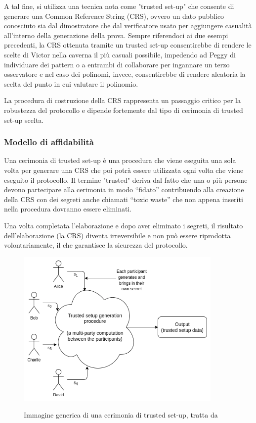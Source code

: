 A tal fine, si utilizza una tecnica nota come "trusted set-up" che consente di generare una Common Reference String
(CRS), ovvero un dato pubblico conosciuto sia dal dimostratore che dal verificatore usato per aggiungere casualità
all’interno della generazione della prova. Sempre riferendoci ai due esempi precedenti, la CRS ottenuta tramite un
trusted set-up consentirebbe di rendere le scelte di Victor nella caverna il più casuali possibile, impedendo ad Peggy
di individuare dei pattern o a entrambi di collaborare per ingannare un terzo osservatore e nel caso dei polinomi,
invece, consentirebbe di rendere aleatoria la scelta del punto in cui valutare il polinomio. 

La procedura di costruzione della CRS rappresenta un passaggio critico per la robustezza del protocollo e dipende
fortemente dal tipo di cerimonia di trusted set-up scelta.

\subsubsection{Modello di affidabilità}

Una cerimonia di trusted set-up è una procedura che viene eseguita una sola volta per generare una CRS che poi potrà
essere utilizzata ogni volta che viene eseguito il protocollo. Il termine "trusted" deriva dal fatto che una o più
persone devono partecipare alla cerimonia in modo “fidato” contribuendo alla creazione della CRS con dei segreti anche
chiamati “toxic waste” che non appena inseriti nella procedura dovranno essere eliminati. \clearpage

Una volta completata l'elaborazione e dopo aver eliminato i segreti, il risultato dell'elaborazione (la CRS) diventa
irreversibile e non può essere riprodotta volontariamente, il che garantisce la sicurezza del protocollo.
\begin{figure}[H]
    \centering
    \includegraphics[width=10cm]{./chapters/1.state-of-art/images/11.trusted_setups.png}
    \label{fig:trusted_setups}
    \captionsetup{justification=centering}
    \caption{Immagine generica di una cerimonia di trusted set-up, tratta da \cite{how-do-trusted-setups-work}}
\end{figure}

